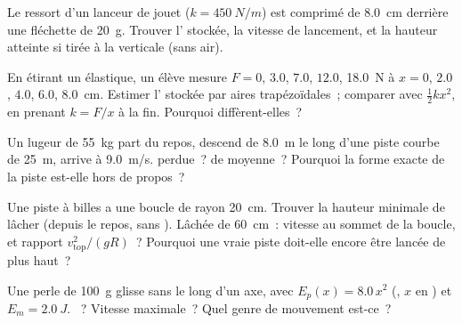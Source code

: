 \begin{exercise}[$\star\star$]\label{exo:g12:work-and-energy:6}
Le ressort d'un lanceur de jouet ($k = \qty{450}{N/m}$) est comprimé
de \qty{8.0}{cm} derrière une fléchette de \qty{20}{g}. Trouver
l' stockée, la vitesse de lancement, et la hauteur
atteinte si tirée à la verticale (sans air).
\end{exercise}

\begin{exercise}[$\star\star$]\label{exo:g12:work-and-energy:7}
En étirant un élastique, un élève mesure $F = 0$, $3.0$, $7.0$,
$12.0$, \qty{18.0}{N} à $x = 0$, $2.0$, $4.0$, $6.0$, \qty{8.0}{cm}.
Estimer l' stockée par aires trapézoïdales~; comparer
avec $\tfrac12 kx^2$, en prenant $k = F/x$ à la fin. Pourquoi
diffèrent-elles~?
\end{exercise}

\begin{exercise}[$\star\star$]\label{exo:g12:work-and-energy:8}
Un lugeur de \qty{55}{kg} part du repos, descend de \qty{8.0}{m} le
long d'une piste courbe de \qty{25}{m}, arrive à \qty{9.0}{m/s}.
 perdue~?  de
 moyenne~? Pourquoi la forme exacte de la piste
est-elle hors de propos~?
\end{exercise}

\begin{exercise}[$\star\star$]\label{exo:g12:work-and-energy:9}
Une piste à billes a une boucle de rayon \qty{20}{cm}. Trouver la
hauteur minimale de lâcher (depuis le repos, sans
). Lâchée de \qty{60}{cm}~: vitesse au sommet de
la boucle, et rapport $v_{\text{top}}^2/(gR)$~? Pourquoi une vraie
piste doit-elle encore être lancée de plus haut~?
\end{exercise}

\begin{exercise}[$\star\star$]\label{exo:g12:work-and-energy:10}
Une perle de \qty{100}{g} glisse sans  le long d'un
axe, avec $E_p(x) = 8.0\,x^2$ (, $x$ en
) et $E_m = \qty{2.0}{J}$.
~? Vitesse maximale~? Quel
genre de mouvement est-ce~?
\end{exercise}

